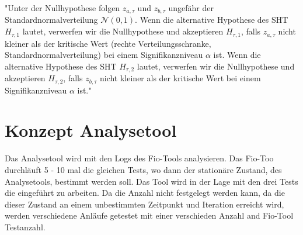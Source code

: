 "Unter der Nullhypothese folgen \( z_{a,\tau} \) und \( z_{b,\tau} \) ungefähr der Standardnormalverteilung \(\mathcal{N}(0, 1)\). 
Wenn die alternative Hypothese des SHT \( H_{\tau,1} \) lautet, verwerfen wir die Nullhypothese und akzeptieren \( H_{\tau,1} \), 
falls \( z_{a,\tau} \) nicht kleiner als der kritische Wert (rechte Verteilungsschranke, Standardnormalverteilung) bei einem Signifikanzniveau \(\alpha\) ist.
Wenn die alternative Hypothese des SHT \( H_{\tau,2} \) lautet, verwerfen wir die Nullhypothese und akzeptieren \( H_{\tau,2} \), 
falls \( z_{b,\tau} \) nicht kleiner als der kritische Wert bei einem Signifikanzniveau \(\alpha\) ist."


\section{Konzept Analysetool}
Das Analysetool wird mit den Logs des Fio-Tools analysieren.
Das Fio-Too durchläuft 5 - 10 mal die gleichen Tests, wo dann der stationäre Zustand, des Analysetools,
bestimmt werden soll. Das Tool wird in der Lage mit den drei Tests die eingeführt zu arbeiten.
Da die Anzahl nicht festgelegt werden kann, da die dieser Zustand an einem unbestimmten Zeitpunkt und Iteration erreicht wird,
werden verschiedene Anläufe getestet mit einer verschieden Anzahl and Fio-Tool Testanzahl.

